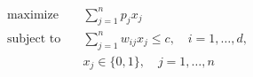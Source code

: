 \begin{align*}
\text{maximize} \quad & \sum_{j=1}^n p_j x_j \\
\text{subject to} \quad & \sum_{j=1}^n w_{ij} x_j \leq c, \quad i = 1, \ldots, d, \\
& x_j \in \lbrace 0, 1 \rbrace, \quad j = 1, \ldots,n
\end{align*}


